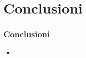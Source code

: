 \documentclass[../../main.tex]{subfiles}
\begin{document}
\section{Conclusioni}

\begin{frame}
    \frametitle{Conclusioni}

    \begin{itemize}
        \item              

    \end{itemize}

\end{frame}
\end{document}
